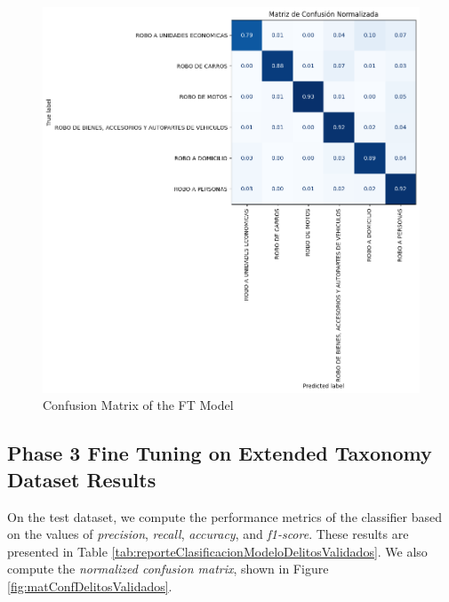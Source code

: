 \documentclass[onecolumn, journal, english, 12pt, a4paper]{IEEEtran} %
\theoremstyle{definition}
\begin{document}
\begin{figure}[!t]
    \centering
    \includegraphics[width=\textwidth]{imgs/FineTuning10_epochs.png}
    \caption{Confusion Matrix of the FT Model}
    \label{fig:matconfusion}
  \end{figure}
  
\subsection{Phase 3 Fine Tuning on Extended Taxonomy Dataset Results}
\label{sec:phase-3-extended-dataset-results-ft}

On the test dataset, we compute the performance metrics of the
classifier based on the values of \emph{precision}, \emph{recall},
\emph{accuracy}, and \emph{f1-score}. These results are presented in
Table \ref{tab:reporteClasificacionModeloDelitosValidados}. We also
compute the \emph{normalized confusion matrix}, shown in Figure
\ref{fig:matConfDelitosValidados}.
\end{document}
